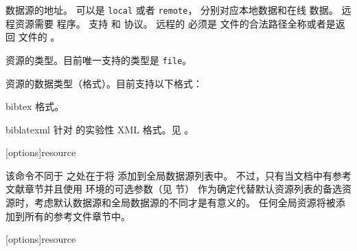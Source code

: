 \begin{ltxsyntax}
\begin{optionlist*}
数据源的地址。
 可以是 \texttt{local} 或者 \texttt{remote}，
分别对应本地数据和在线  数据。
远程资源需要 \biber{} 程序。
支持  和  协议。
远程的  必须是  文件的合法路径全称或者是返回  文件的 。



资源的类型。目前唯一支持的类型是 \texttt{file}。



资源的数据类型（格式）。目前支持以下格式：

\begin{valuelist}[zoterordfxml]

\item[bibtex] %
\BibTeX 格式。

\item[biblatexml] %
针对 \biblatex 的实验性 XML 格式。见 。

\end{valuelist}

\end{optionlist*}


[options]{resource}


该命令不同于  之处在于将  添加到全局数据源列表中。
不过，只有当文档中有参考文献章节并且使用  环境的可选参数（见  节）
作为确定代替默认资源列表的备选资源时，考虑默认数据源和全局数据源的不同才是有意义的。
任何全局资源将被添加到所有的参考文件章节中。

[options]{resource}



\end{ltxsyntax}
